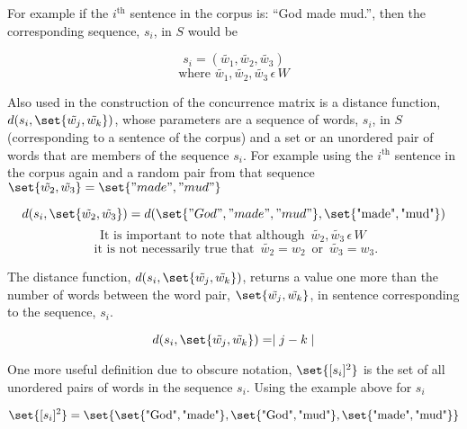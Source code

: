 \documentclass{article}
\begin{document}
For example if the $i^{\text{th}}$ sentence in the corpus is: ``God made mud.'', then the corresponding sequence, $s_i$, in $S$ would be

\begin{equation*}
s_i = \left( \tilde{w_1}, \tilde{w_2}, \tilde{w_3} \right)
\end{equation*}
\begin{equation*}
\text{where } \tilde{w_1}, \tilde{w_2}, \tilde{w_3} \, \epsilon \, W
\end{equation*}

Also used in the construction of the concurrence matrix is a distance function, $d(s_i, \set{\tilde{w_j}, \tilde{w_k}})$, whose parameters are a sequence of words, $s_i$, in $S$ (corresponding to a sentence of the corpus) and a set or an unordered pair of words that are members of the sequence $s_i$. For example using the $i^{\text{th}}$ sentence in the corpus again and a random pair from that sequence $\set{\tilde{w_2}, \tilde{w_3}} = \set{"made", "mud"}$

\begin{equation*}
d(s_i, \set{\tilde{w_2}, \tilde{w_3}}) = d(\set{"God", "made", "mud"}, \set{\text{"made"}, \text{"mud"}})
\end{equation*}
\begin{equation*}
\text{It is important to note that although }\, \tilde{w_2}, \tilde{w_3} \, \epsilon \, W \, 
\end{equation*}
\begin{equation*}
\text{ it is not necessarily true that } \, \tilde{w_2} = w_2 \, \text{ or } \, \tilde{w_3} = w_3.
\end{equation*}

The distance function, $d(s_i, \set{\tilde{w_j}, \tilde{w_k}})$, returns a value one more than the number of words between the word pair, $\set{\tilde{w_j}, \tilde{w_k}}$, in sentence corresponding to the sequence, $s_i$.

\begin{equation*}
d(s_i, \set{\tilde{w_j}, \tilde{w_k}}) = \mid j - k \mid
\end{equation*}

One more useful definition due to obscure notation, $\set{[s_i]^2}$ is the set of all unordered pairs of words in the sequence $s_i$. Using the example above for $s_i$

\begin{equation*}
\set{[s_i]^2} = \set{\set{\text{"God"}, \text{"made"}}, \set{\text{"God"}, \text{"mud"}}, \set{\text{"made"}, \text{"mud"}} }
\end{equation*}
\end{document}
